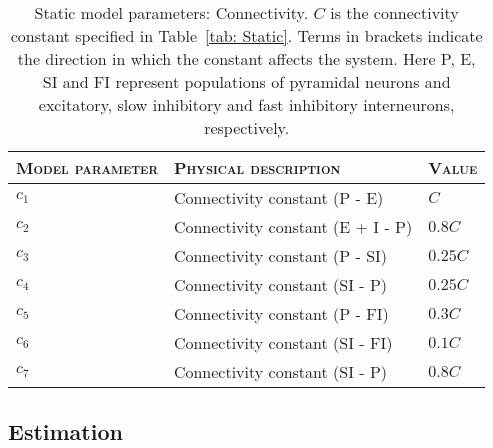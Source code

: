 \begin{center}%
	\begin{table}
			\caption[Static Model Parameters: Connectivity]{Static model parameters: Connectivity. $C$ is the connectivity constant specified in Table~\ref{tab: Static}. Terms in brackets indicate the direction in which the constant affects the system. Here P, E, SI and FI represent populations of pyramidal neurons and excitatory, slow inhibitory and fast inhibitory interneurons, respectively.}
		\begin{tabular}{||p{4cm}|p{7cm}|p{2cm}||}\hline
			 \textsc{Model parameter}  & \textsc{Physical description} & \textsc{Value}
			   \\\hline\hline
			 $c_{1}$ & Connectivity constant (P - E) & $C$ \\\hline
			 $c_{2}$ & Connectivity constant (E + I - P) & $0.8C$ \\\hline
			 $c_{3}$ & Connectivity constant (P - SI) & $0.25C$  \\\hline
			 $c_{4}$ & Connectivity constant (SI - P)& $0.25C$ \\\hline
			 $c_{5}$ & Connectivity constant (P - FI) & $0.3C$ \\\hline
			 $c_{6}$ & Connectivity constant (SI - FI) & $0.1C$ \\\hline
			 $c_{7}$ & Connectivity constant (SI - P) & $0.8C$ \\\hline\hline
		\end{tabular}
		\label{tab: Connectivity}
	\end{table}
\end{center}%
\normalsize
\onehalfspacing

\subsection{Estimation}

